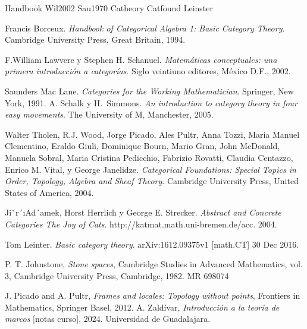 \documentclass{comunicaciones}
\begin{document}
Handbook Wil2002 Sau1970 Catheory Catfound Leinster
\noindent 
\begin{thebibliography}{99}

 Francis Borceux. \textit{Handbook of Categorical Algebra 1: Basic Category Theory}. Cambridge University Press, Great Britain, 1994.

 F.William Lawvere y Stephen H. Schanuel. \textit{Matemáticas conceptuales: una primera introducción a categorías}. Siglo veintiuno editores, México D.F., 2002.

 Saunders Mac Lane. \textit{Categories for the Working Mathematician}. Springer, New York, 1991.
 A. Schalk y H.~Simmons. \textit{An introduction to category theory in four easy movements}. The University of M, Manchester, 2005.

 Walter Tholen, R.J. Wood, Jorge Picado, Ales Pultr, Anna Tozzi, Maria Manuel Clementino, Eraldo Giuli, Dominique Bourn, Mario Gran, 
John McDonald, Manuela Sobral, Maria Cristina Pedicchio, Fabrizio Rovatti, Claudia Centazzo, Enrico M. Vital, y George Janelidze.
\textit{Categorical Foundations: Special Topics in Order, Topology, Algebra and Sheaf Theory}. Cambridge University Press, United States of America, 2004.

 Jiˇr´ıAd´amek, Horst Herrlich y George E. Strecker. \textit{Abstract and Concrete Categories The Joy of Cats}. http://katmat.math.uni-bremen.de/acc. 2004.

 Tom Leinter. \textit{Basic category theory}. arXiv:1612.09375v1 [math.CT] 30 Dec 2016.

 P. T. Johnstone, \textit{Stone spaces}, Cambridge Studies in Advanced Mathematics, vol. 3, Cambridge University Press, Cambridge, 1982. MR 698074
  
 J. Picado and A. Pultr, \textit{Frames and locales: Topology without points}, Frontiers in Mathematics, Springer Basel, 2012.
 A. Zaldívar, \textit{Introducción a la teoría de marcos} [notas curso], 2024. Universidad de Guadalajara.

\end{thebibliography}
\end{document}
